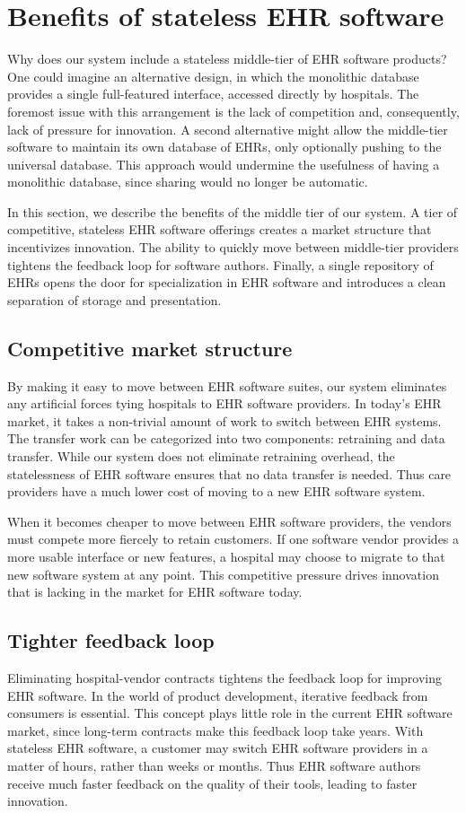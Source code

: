 \section{Benefits of stateless EHR software}\label{sec:benefits-stateless}
Why does our system include a stateless middle-tier of EHR software products? One could imagine an alternative design, in which the monolithic database provides a single full-featured interface, accessed directly by hospitals. The foremost issue with this arrangement is the lack of competition and, consequently, lack of pressure for innovation. A second alternative might allow the middle-tier software to maintain its own database of EHRs, only optionally pushing to the universal database. This approach would undermine the usefulness of having a monolithic database, since sharing would no longer be automatic.

In this section, we describe the benefits of the middle tier of our system. A tier of competitive, stateless EHR software offerings creates a market structure that incentivizes innovation. The ability to quickly move between middle-tier providers tightens the feedback loop for software authors. Finally, a single repository of EHRs opens the door for specialization in EHR software and introduces a clean separation of storage and presentation.

\subsection{Competitive market structure}
By making it easy to move between EHR software suites, our system eliminates any artificial forces tying hospitals to EHR software providers. In today's EHR market, it takes a non-trivial amount of work to switch between EHR systems. The transfer work can be categorized into two components: retraining and data transfer. While our system does not eliminate retraining overhead, the statelessness of EHR software ensures that no data transfer is needed. Thus care providers have a much lower cost of moving to a new EHR software system.

When it becomes cheaper to move between EHR software prov\-id\-ers, the vendors must compete more fiercely to retain customers. If one software vendor provides a more usable interface or new features, a hospital may choose to migrate to that new software system at any point. This competitive pressure drives innovation that is lacking in the market for EHR software today.

\subsection{Tighter feedback loop}
Eliminating hospital-vendor contracts tightens the feedback loop for improving EHR software. In the world of product development, iterative feedback from consumers is essential. This concept plays little role in the current EHR software market, since long-term contracts make this feedback loop take years. With stateless EHR software, a customer may switch EHR software providers in a matter of hours, rather than weeks or months. Thus EHR software authors receive much faster feedback on the quality of their tools, leading to faster innovation.

